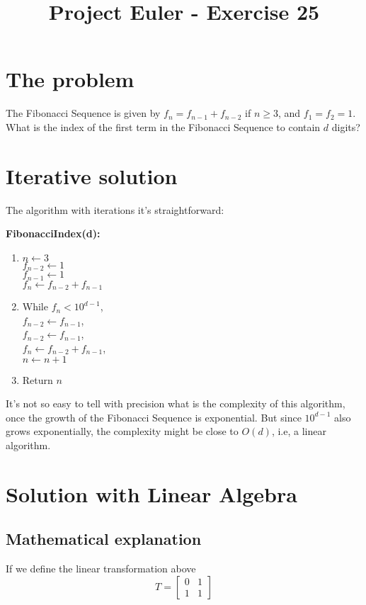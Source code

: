 \documentclass{article}
\title{Project Euler - Exercise 25}
\date{}
\begin{document}
\maketitle

\section*{The problem}

The Fibonacci Sequence is given by $f_n = f_{n - 1} + f_{n - 2}$
if $n\geq 3$, and $f_1 = f_2 = 1$.\\

What is the index of the first term in the Fibonacci Sequence to contain 
$d$ digits?

\section*{Iterative solution}

The algorithm with iterations it's straightforward:

\vspace{0.5cm}
\textbf{FibonacciIndex(d):}
\begin{enumerate}
    \item $n \leftarrow 3$\\
    $f_{n - 2} \leftarrow 1$\\
    $f_{n - 1} \leftarrow 1$\\
    $f_n \leftarrow f_{n - 2} + f_{n - 1}$
    \item While $f_n < 10^{d - 1}$, \\
    $ f_{n-2} \leftarrow f_{n - 1}$,\\
    $f_{n-2} \leftarrow f_{n - 1}$, \\
    $f_n \leftarrow f_{n - 2} + f_{n - 1}$,\\
    $n \leftarrow n + 1$
    \item Return $n$
\end{enumerate}

It's not so easy to tell with precision what is the complexity of this
algorithm, once the growth of the Fibonacci Sequence is exponential. But since
$10^{d - 1}$ also grows exponentially, the complexity might be close to $O(d)$,
i.e, a linear algorithm.

\newpage

\section*{Solution with Linear Algebra}
\subsection*{Mathematical explanation}
If we define the linear transformation above
\begin{equation*}
    T =
    \begin{bmatrix}
        0 & 1\\
        1 & 1
    \end{bmatrix}
\end{equation*}
\end{document}

